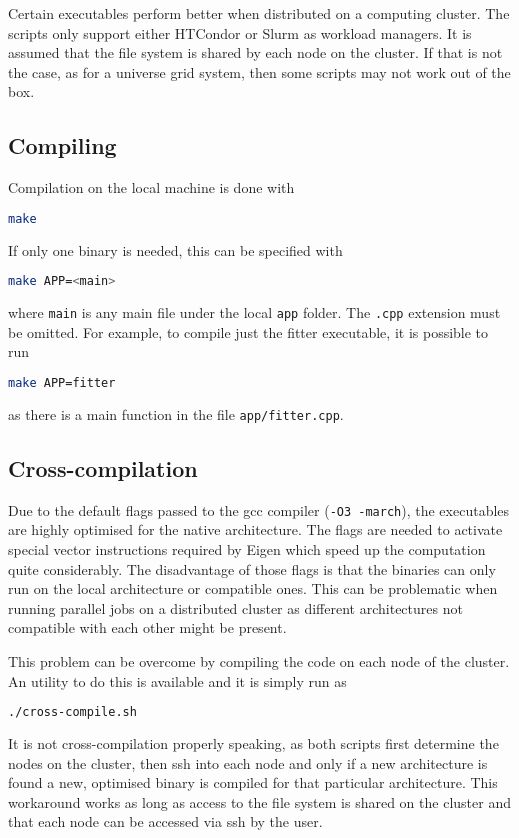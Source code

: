 \documentclass[a4paper, 11pt]{article}
\begin{document}
Certain executables perform better when distributed on a computing cluster.
The scripts only support either HTCondor or Slurm as workload managers.
It is assumed that the file system is shared by each node on the cluster.
If that is not the case, as for a universe grid system, then some scripts may not work out of the box.

\subsection{Compiling}

Compilation on the local machine is done with
\begin{lstlisting}[language=bash]
	make
\end{lstlisting}
If only one binary is needed, this can be specified with
\begin{lstlisting}[language=bash]
	make APP=<main>
\end{lstlisting}
where \texttt{main} is any main file under the local \texttt{app} folder.
The \texttt{.cpp} extension must be omitted.
For example, to compile just the fitter executable, it is possible to run
\begin{lstlisting}[language=bash]
	make APP=fitter
\end{lstlisting}
as there is a main function in the file \texttt{app/fitter.cpp}.

\subsection{Cross-compilation}

Due to the default flags passed to the gcc compiler (\texttt{-O3 -march}), the executables are highly optimised %
for the native architecture.
The flags are needed to activate special vector instructions required by Eigen which speed up %
the computation quite considerably.
The disadvantage of those flags is that the binaries can only run on the local architecture or compatible ones.
This can be problematic when running parallel jobs on a distributed cluster as different architectures %
not compatible with each other might be present.

This problem can be overcome by compiling the code on each node of the cluster.
An utility to do this is available and it is simply run as
\begin{lstlisting}[language=bash]
	./cross-compile.sh
\end{lstlisting}
It is not cross-compilation properly speaking, as both scripts first determine the nodes %
on the cluster, then ssh into each node and only if a new architecture is found a new, optimised binary is compiled %
for that particular architecture.
This workaround works as long as access to the file system is shared on the cluster and that each node can %
be accessed via ssh by the user.
\end{document}
